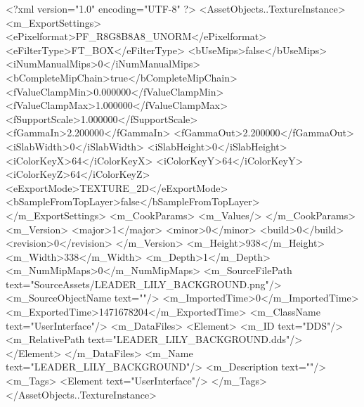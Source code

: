 <?xml version="1.0" encoding="UTF-8" ?>
<AssetObjects..TextureInstance>
	<m_ExportSettings>
		<ePixelformat>PF_R8G8B8A8_UNORM</ePixelformat>
		<eFilterType>FT_BOX</eFilterType>
		<bUseMips>false</bUseMips>
		<iNumManualMips>0</iNumManualMips>
		<bCompleteMipChain>true</bCompleteMipChain>
		<fValueClampMin>0.000000</fValueClampMin>
		<fValueClampMax>1.000000</fValueClampMax>
		<fSupportScale>1.000000</fSupportScale>
		<fGammaIn>2.200000</fGammaIn>
		<fGammaOut>2.200000</fGammaOut>
		<iSlabWidth>0</iSlabWidth>
		<iSlabHeight>0</iSlabHeight>
		<iColorKeyX>64</iColorKeyX>
		<iColorKeyY>64</iColorKeyY>
		<iColorKeyZ>64</iColorKeyZ>
		<eExportMode>TEXTURE_2D</eExportMode>
		<bSampleFromTopLayer>false</bSampleFromTopLayer>
	</m_ExportSettings>
	<m_CookParams>
		<m_Values/>
	</m_CookParams>
	<m_Version>
		<major>1</major>
		<minor>0</minor>
		<build>0</build>
		<revision>0</revision>
	</m_Version>
	<m_Height>938</m_Height>
	<m_Width>338</m_Width>
	<m_Depth>1</m_Depth>
	<m_NumMipMaps>0</m_NumMipMaps>
	<m_SourceFilePath text="SourceAssets/LEADER_LILY_BACKGROUND.png"/>
	<m_SourceObjectName text=""/>
	<m_ImportedTime>0</m_ImportedTime>
	<m_ExportedTime>1471678204</m_ExportedTime>
	<m_ClassName text="UserInterface"/>
	<m_DataFiles>
		<Element>
			<m_ID text="DDS"/>
			<m_RelativePath text="LEADER_LILY_BACKGROUND.dds"/>
		</Element>
	</m_DataFiles>
	<m_Name text="LEADER_LILY_BACKGROUND"/>
	<m_Description text=""/>
	<m_Tags>
		<Element text="UserInterface"/>
	</m_Tags>
</AssetObjects..TextureInstance>


